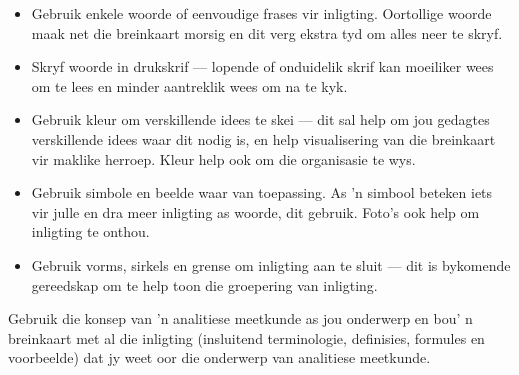 \begin{itemize}[noitemsep]
\item
  Gebruik enkele woorde of eenvoudige frases vir inligting. Oortollige
  woorde maak net die breinkaart morsig en dit verg ekstra tyd om
  alles neer te skryf.
\item
Skryf woorde in drukskrif --- lopende of onduidelik skrif kan
moeiliker wees om te lees en minder aantreklik wees om na te kyk.
\item
  Gebruik kleur om verskillende idees te skei --- dit sal help om jou
  gedagtes verskillende idees waar dit nodig is, en help visualisering
  van die breinkaart vir maklike herroep. Kleur help ook om die
  organisasie te wys.
\item
  Gebruik simbole en beelde waar van toepassing. As 'n simbool beteken
  iets vir julle en dra meer inligting as woorde, dit gebruik. Foto's
  ook help om inligting te onthou.
\item
  Gebruik vorms, sirkels en grense om inligting aan te sluit --- dit
  is bykomende gereedskap om te help toon die groepering van
  inligting.
\end{itemize}
Gebruik die konsep van 'n analitiese meetkunde as jou onderwerp en
bou' n breinkaart met al die inligting (insluitend terminologie,
definisies, formules en voorbeelde) dat jy weet oor die onderwerp van
analitiese meetkunde.

